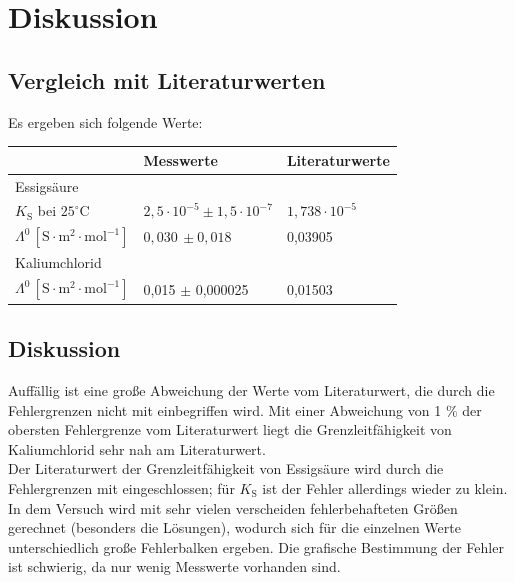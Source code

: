 \documentclass[12pt,a4paper,titlepage,headinclude,bibtotoc]{scrartcl}
\begin{document}
\section{Diskussion}
\subsection{Vergleich mit Literaturwerten}

Es ergeben sich folgende Werte:\\

\begin{table} [h]
\centering 
\begin{tabular}{p{3cm}|p{5cm}p{5cm}}
& Messwerte & Literaturwerte\footnotemark\\
\hline
Essigsäure & &\\
 $K_{\mathrm{S}}$  bei $25^\circ\text{C}$ & $2,5 \cdot 10^{-5} \pm 1,5 \cdot 10^{-7}$& $1,738 \cdot 10^{-5}$\\
$\Lambda^0\, [\mathrm{S} \cdot \mathrm{m^2} \cdot \mathrm{mol^{-1}}]$ & $ 0,030\, \pm 0,018 $& 0,03905\\
\hline
Kaliumchlorid & &\\
$\Lambda^0\, [\mathrm{S} \cdot \mathrm{m^2} \cdot \mathrm{mol^{-1}}]$ & 0,015 $\pm$ 0,000025 & 0,01503\\
\end{tabular}
\end{table}



\subsection{Diskussion}

Auffällig ist eine große Abweichung der Werte vom Literaturwert, die durch die Fehlergrenzen nicht mit einbegriffen wird. Mit einer Abweichung von 1 $\%$ der obersten Fehlergrenze vom Literaturwert liegt die Grenzleitfähigkeit von Kaliumchlorid sehr nah am Literaturwert. \\
Der Literaturwert der Grenzleitfähigkeit von Essigsäure wird durch die Fehlergrenzen mit eingeschlossen; für $K_\mathrm{S}$ ist der Fehler allerdings wieder zu klein.\\

In dem Versuch wird mit sehr vielen verscheiden fehlerbehafteten Größen gerechnet (besonders die Lösungen), wodurch sich für die einzelnen Werte unterschiedlich große Fehlerbalken ergeben. Die grafische Bestimmung der Fehler ist schwierig, da nur wenig Messwerte vorhanden sind. \\
\end{document}

